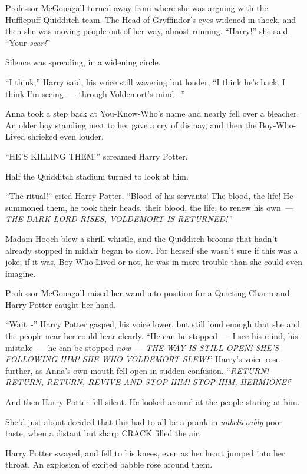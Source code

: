 Professor McGonagall turned away from where she was arguing with the Hufflepuff Quidditch team. The Head of Gryffindor's eyes widened in shock, and then she was moving people out of her way, almost running. ``Harry!'' she said. ``Your \emph{scar!}''

Silence was spreading, in a widening circle.

``I think,'' Harry said, his voice still wavering but louder, ``I think he's back. I think I'm seeing~--- through Voldemort's mind~-''

Anna took a step back at You-Know-Who's name and nearly fell over a bleacher. An older boy standing next to her gave a cry of dismay, and then the Boy-Who-Lived shrieked even louder.

``HE'S KILLING THEM!'' screamed Harry Potter.

Half the Quidditch stadium turned to look at him.

``The ritual!'' cried Harry Potter. ``Blood of his servants! The blood, the life! He summoned them, he took their heads, their blood, the life, to renew his own~--- \emph{THE DARK LORD RISES, VOLDEMORT IS RETURNED!''}

Madam Hooch blew a shrill whistle, and the Quidditch brooms that hadn't already stopped in midair began to slow. For herself she wasn't sure if this was a joke; if it was, Boy-Who-Lived or not, he was in more trouble than she could even imagine.

Professor McGonagall raised her wand into position for a Quieting Charm and Harry Potter caught her hand.

``Wait~-'' Harry Potter gasped, his voice lower, but still loud enough that she and the people near her could hear clearly. ``He can be stopped~--- I see his mind, his mistake~--- he can be stopped \emph{now}~--- \emph{THE WAY IS STILL OPEN! SHE'S FOLLOWING HIM! SHE WHO VOLDEMORT SLEW!}'' Harry's voice rose further, as Anna's own mouth fell open in sudden confusion. ``\emph{RETURN! RETURN, RETURN, REVIVE AND STOP HIM! STOP HIM, HERMIONE!}''

And then Harry Potter fell silent. He looked around at the people staring at him.

She'd just about decided that this had to all be a prank in \emph{unbelievably} poor taste, when a distant but sharp CRACK filled the air.

Harry Potter swayed, and fell to his knees, even as her heart jumped into her throat. An explosion of excited babble rose around them.

